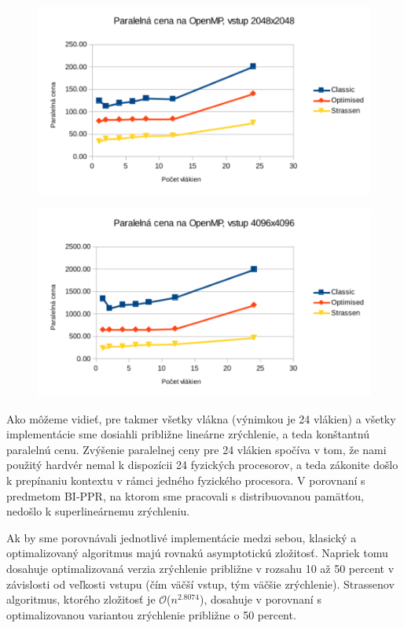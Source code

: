 \documentclass[slovak]{article}
\begin{document}
\begin{figure}\centering
	\includegraphics[scale=1]{./images/2048_cena.pdf}
	\label{gr:graf5}
\end{figure}  

\begin{figure}\centering
	\includegraphics[scale=1]{./images/4096_cena.pdf}
	\label{gr:graf6}
\end{figure}  

Ako môžeme vidieť, pre takmer všetky vlákna (výnimkou je 24 vlákien) a všetky implementácie sme dosiahli približne lineárne zrýchlenie, a teda konštantnú paralelnú cenu. Zvýšenie paralelnej ceny pre 24 vlákien spočíva v tom, že nami použitý hardvér nemal k dispozícii 24 fyzických procesorov, a teda zákonite došlo k prepínaniu kontextu v rámci jedného fyzického procesora. V porovnaní s predmetom BI-PPR, na ktorom sme pracovali s distribuovanou pamätťou, nedošlo k superlineárnemu zrýchleniu. 

Ak by sme porovnávali jednotlivé implementácie medzi sebou, klasický a optimalizovaný algoritmus majú rovnakú asymptotickú zložitosť. Napriek tomu dosahuje optimalizovaná verzia zrýchlenie približne v rozsahu 10 až 50 percent v závislosti od veľkosti vstupu (čím väčší vstup, tým väčšie zrýchlenie). Strassenov algoritmus, ktorého zložitosť je $\mathcal{O}$($n^{2.8074}$), dosahuje v porovnaní s optimalizovanou variantou zrýchlenie približne o 50 percent.
\end{document}

